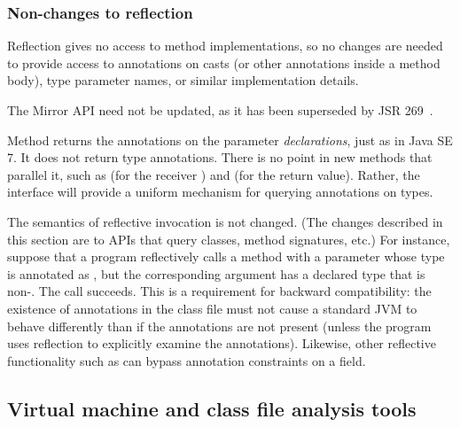 \documentclass[10pt]{article}
\begin{document}


\subsubsection{Non-changes to reflection\label{non-changes-to-reflection}}

Reflection gives no access to method implementations, so no changes are
needed to
provide access to annotations on casts (or other annotations inside
a method body), type parameter names, or similar implementation details.


The Mirror API  need not be updated, as it has been
superseded by JSR 269~\cite{JSR269}.


Method  returns the annotations on
the parameter \emph{declarations}, just as in Java SE 7.  It does not return
type annotations.  There is no point in new methods that parallel it,
such as  (for the receiver
) and  (for the return
value).  Rather, the interface will provide a uniform mechanism for
querying annotations on types.


The semantics of reflective invocation is not changed.
(The changes described in this section are to APIs that query classes,
method signatures, etc.)
For instance, suppose that a program reflectively calls a method
with a parameter whose type is annotated as , but the
corresponding argument has a declared type that is non-.
The call succeeds.  This is a requirement for backward compatibility:  the
existence of annotations in the class file must not cause a standard JVM
to behave differently than if the annotations are not present (unless the
program uses reflection to explicitly examine the annotations).  Likewise,
other reflective functionality such as 
can bypass annotation constraints on a field.



\subsection{Virtual machine and class file analysis tools\label{class-file-tools}}
\end{document}
